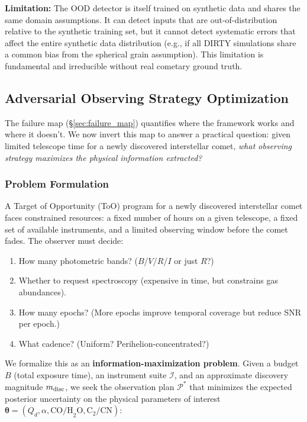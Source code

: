 \documentclass[preprint2]{aastex631}
\begin{document}
\textbf{Limitation:} The OOD detector is itself trained on synthetic data and shares the same domain assumptions. It can detect inputs that are out-of-distribution relative to the synthetic training set, but it cannot detect systematic errors that affect the entire synthetic data distribution (e.g., if all DIRTY simulations share a common bias from the spherical grain assumption). This limitation is fundamental and irreducible without real cometary ground truth.

\subsection{Adversarial Observing Strategy Optimization}\label{sec:obsopt}

The failure map (\S\ref{sec:failure_map}) quantifies where the framework works and where it doesn't. We now invert this map to answer a practical question: given limited telescope time for a newly discovered interstellar comet, \textit{what observing strategy maximizes the physical information extracted?}

\subsubsection{Problem Formulation}

A Target of Opportunity (ToO) program for a newly discovered interstellar comet faces constrained resources: a fixed number of hours on a given telescope, a fixed set of available instruments, and a limited observing window before the comet fades. The observer must decide:
\begin{enumerate}
    \item How many photometric bands? ($B$/$V$/$R$/$I$ or just $R$?)
    \item Whether to request spectroscopy (expensive in time, but constrains gas abundances).
    \item How many epochs? (More epochs improve temporal coverage but reduce SNR per epoch.)
    \item What cadence? (Uniform? Perihelion-concentrated?)
\end{enumerate}

We formalize this as an \textbf{information-maximization problem}. Given a budget $B$ (total exposure time), an instrument suite $\mathcal{I}$, and an approximate discovery magnitude $m_{\rm disc}$, we seek the observation plan $\mathcal{P}^*$ that minimizes the expected posterior uncertainty on the physical parameters of interest $\boldsymbol{\theta} = (Q_d, \alpha, \text{CO/H}_2\text{O}, \text{C}_2/\text{CN})$:
\end{document}
